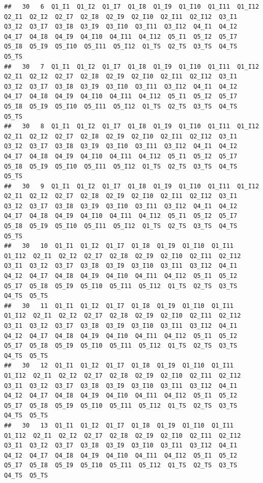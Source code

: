 \documentclass[]{book}
\begin{document}
\begin{verbatim}
##   30   6  Q1_I1  Q1_I2  Q1_I7  Q1_I8  Q1_I9  Q1_I10  Q1_I11  Q1_I12  Q2_I1  Q2_I2  Q2_I7  Q2_I8  Q2_I9  Q2_I10  Q2_I11  Q2_I12  Q3_I1  Q3_I2  Q3_I7  Q3_I8  Q3_I9  Q3_I10  Q3_I11  Q3_I12  Q4_I1  Q4_I2  Q4_I7  Q4_I8  Q4_I9  Q4_I10  Q4_I11  Q4_I12  Q5_I1  Q5_I2  Q5_I7  Q5_I8  Q5_I9  Q5_I10  Q5_I11  Q5_I12  Q1_TS  Q2_TS  Q3_TS  Q4_TS  Q5_TS
##   30   7  Q1_I1  Q1_I2  Q1_I7  Q1_I8  Q1_I9  Q1_I10  Q1_I11  Q1_I12  Q2_I1  Q2_I2  Q2_I7  Q2_I8  Q2_I9  Q2_I10  Q2_I11  Q2_I12  Q3_I1  Q3_I2  Q3_I7  Q3_I8  Q3_I9  Q3_I10  Q3_I11  Q3_I12  Q4_I1  Q4_I2  Q4_I7  Q4_I8  Q4_I9  Q4_I10  Q4_I11  Q4_I12  Q5_I1  Q5_I2  Q5_I7  Q5_I8  Q5_I9  Q5_I10  Q5_I11  Q5_I12  Q1_TS  Q2_TS  Q3_TS  Q4_TS  Q5_TS
##   30   8  Q1_I1  Q1_I2  Q1_I7  Q1_I8  Q1_I9  Q1_I10  Q1_I11  Q1_I12  Q2_I1  Q2_I2  Q2_I7  Q2_I8  Q2_I9  Q2_I10  Q2_I11  Q2_I12  Q3_I1  Q3_I2  Q3_I7  Q3_I8  Q3_I9  Q3_I10  Q3_I11  Q3_I12  Q4_I1  Q4_I2  Q4_I7  Q4_I8  Q4_I9  Q4_I10  Q4_I11  Q4_I12  Q5_I1  Q5_I2  Q5_I7  Q5_I8  Q5_I9  Q5_I10  Q5_I11  Q5_I12  Q1_TS  Q2_TS  Q3_TS  Q4_TS  Q5_TS
##   30   9  Q1_I1  Q1_I2  Q1_I7  Q1_I8  Q1_I9  Q1_I10  Q1_I11  Q1_I12  Q2_I1  Q2_I2  Q2_I7  Q2_I8  Q2_I9  Q2_I10  Q2_I11  Q2_I12  Q3_I1  Q3_I2  Q3_I7  Q3_I8  Q3_I9  Q3_I10  Q3_I11  Q3_I12  Q4_I1  Q4_I2  Q4_I7  Q4_I8  Q4_I9  Q4_I10  Q4_I11  Q4_I12  Q5_I1  Q5_I2  Q5_I7  Q5_I8  Q5_I9  Q5_I10  Q5_I11  Q5_I12  Q1_TS  Q2_TS  Q3_TS  Q4_TS  Q5_TS
##   30   10  Q1_I1  Q1_I2  Q1_I7  Q1_I8  Q1_I9  Q1_I10  Q1_I11  Q1_I12  Q2_I1  Q2_I2  Q2_I7  Q2_I8  Q2_I9  Q2_I10  Q2_I11  Q2_I12  Q3_I1  Q3_I2  Q3_I7  Q3_I8  Q3_I9  Q3_I10  Q3_I11  Q3_I12  Q4_I1  Q4_I2  Q4_I7  Q4_I8  Q4_I9  Q4_I10  Q4_I11  Q4_I12  Q5_I1  Q5_I2  Q5_I7  Q5_I8  Q5_I9  Q5_I10  Q5_I11  Q5_I12  Q1_TS  Q2_TS  Q3_TS  Q4_TS  Q5_TS
##   30   11  Q1_I1  Q1_I2  Q1_I7  Q1_I8  Q1_I9  Q1_I10  Q1_I11  Q1_I12  Q2_I1  Q2_I2  Q2_I7  Q2_I8  Q2_I9  Q2_I10  Q2_I11  Q2_I12  Q3_I1  Q3_I2  Q3_I7  Q3_I8  Q3_I9  Q3_I10  Q3_I11  Q3_I12  Q4_I1  Q4_I2  Q4_I7  Q4_I8  Q4_I9  Q4_I10  Q4_I11  Q4_I12  Q5_I1  Q5_I2  Q5_I7  Q5_I8  Q5_I9  Q5_I10  Q5_I11  Q5_I12  Q1_TS  Q2_TS  Q3_TS  Q4_TS  Q5_TS
##   30   12  Q1_I1  Q1_I2  Q1_I7  Q1_I8  Q1_I9  Q1_I10  Q1_I11  Q1_I12  Q2_I1  Q2_I2  Q2_I7  Q2_I8  Q2_I9  Q2_I10  Q2_I11  Q2_I12  Q3_I1  Q3_I2  Q3_I7  Q3_I8  Q3_I9  Q3_I10  Q3_I11  Q3_I12  Q4_I1  Q4_I2  Q4_I7  Q4_I8  Q4_I9  Q4_I10  Q4_I11  Q4_I12  Q5_I1  Q5_I2  Q5_I7  Q5_I8  Q5_I9  Q5_I10  Q5_I11  Q5_I12  Q1_TS  Q2_TS  Q3_TS  Q4_TS  Q5_TS
##   30   13  Q1_I1  Q1_I2  Q1_I7  Q1_I8  Q1_I9  Q1_I10  Q1_I11  Q1_I12  Q2_I1  Q2_I2  Q2_I7  Q2_I8  Q2_I9  Q2_I10  Q2_I11  Q2_I12  Q3_I1  Q3_I2  Q3_I7  Q3_I8  Q3_I9  Q3_I10  Q3_I11  Q3_I12  Q4_I1  Q4_I2  Q4_I7  Q4_I8  Q4_I9  Q4_I10  Q4_I11  Q4_I12  Q5_I1  Q5_I2  Q5_I7  Q5_I8  Q5_I9  Q5_I10  Q5_I11  Q5_I12  Q1_TS  Q2_TS  Q3_TS  Q4_TS  Q5_TS

\end{verbatim}
\end{document}
